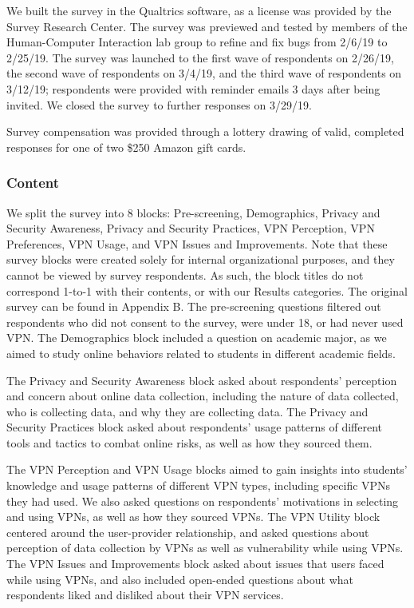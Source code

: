 We built the survey in the Qualtrics software, as a license was provided by the Survey Research Center. The survey was previewed and tested by members of the Human-Computer Interaction lab group to refine and fix bugs from 2/6/19 to 2/25/19. The survey was launched to the first wave of respondents on 2/26/19, the second wave of respondents on 3/4/19, and the third wave of respondents on 3/12/19; respondents were provided with reminder emails 3 days after being invited. We closed the survey to further responses on 3/29/19.

Survey compensation was provided through a lottery drawing of valid, completed responses for one of two \$250 Amazon gift cards.

\subsubsection{Content}

We split the survey into 8 blocks: Pre-screening, Demographics, Privacy and Security Awareness, Privacy and Security Practices, VPN Perception, VPN Preferences, VPN Usage, and VPN Issues and Improvements. Note that these survey blocks were created solely for internal organizational purposes, and they cannot be viewed by survey respondents. As such, the block titles do not correspond 1-to-1 with their contents, or with our Results categories. The original survey can be found in Appendix B.
The pre-screening questions filtered out respondents who did not consent to the survey, were under 18, or had never used VPN. The Demographics block included a question on academic major, as we aimed to study online behaviors related to students in different academic fields.

The Privacy and Security Awareness block asked about respondents' perception and concern about online data collection, including the nature of data collected, who is collecting data, and why they are collecting data. The Privacy and Security Practices block asked about respondents' usage patterns of different tools and tactics to combat online risks, as well as how they sourced them.

The VPN Perception and VPN Usage blocks aimed to gain insights into students’ knowledge and usage patterns of different VPN types, including specific VPNs they had used. We also asked questions on respondents’ motivations in selecting and using VPNs, as well as how they sourced VPNs. The VPN Utility block centered around the user-provider relationship, and asked questions about perception of data collection by VPNs as well as vulnerability while using VPNs. The VPN Issues and Improvements block asked about issues that users faced while using VPNs, and also included open-ended questions about what respondents liked and disliked about their VPN services.


